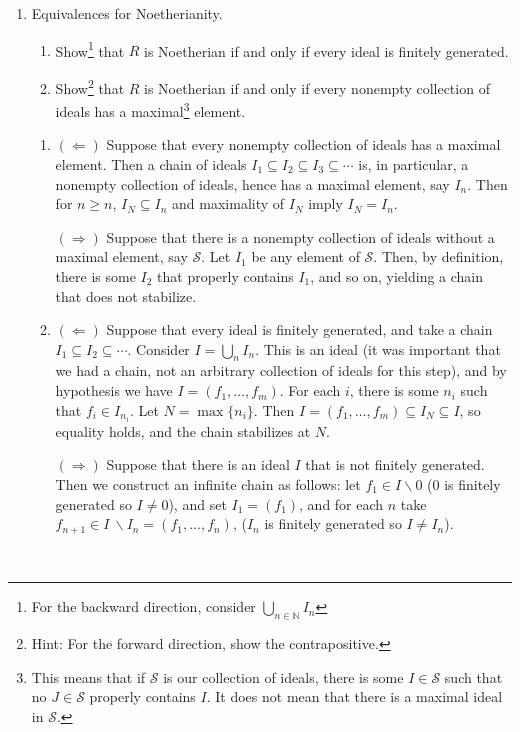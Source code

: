 \documentclass[12pt]{amsart}
\newcommand{\Bold}[1]{\contour{black}{#1}}
\newcommand{\N}{\mathbb{N}}
\newcommand{\1}{\mathbbm{1}}
\newcommand{\solution}[1]{\ifthenelse {\equal{\displaysol}{1}} {\begin{framed}{\color{meretale}\noindent #1}\end{framed}} { \ }}
\newcommand\itemA{\stepcounter{enumi}\item[{\Bold{(\theenumi)}}]}
\newcommand\itema{\stepcounter{enumii}\item[{\Bold{(\theenumii)}}]}
\begin{document}
 
\begin{enumerate}
\itemA Equivalences for Noetherianity.
\begin{enumerate}
\itema Show\footnote{For the backward direction, consider $\bigcup_{n\in \N} I_n$} that $R$ is Noetherian if and only if every ideal is finitely generated.
\itema Show\footnote{Hint: For the forward direction, show the contrapositive.} that $R$ is Noetherian if and only if every nonempty collection of ideals has a maximal\footnote{This means that if $\mathcal{S}$ is our collection of ideals, there is some $I\in \mathcal{S}$ such that no $J\in \mathcal{S}$ properly contains $I$. It does not mean that there is a maximal ideal in $\mathcal{S}$.} element.
\end{enumerate}


\solution{
\begin{enumerate}
\itema $(\Leftarrow)$ Suppose that every nonempty collection of ideals has a maximal element. Then a chain of ideals $I_1 \subseteq I_2 \subseteq I_3 \subseteq \cdots$ is, in particular, a nonempty collection of ideals, hence has a maximal element, say $I_n$. Then for $n\geq n$, $I_N \subseteq I_n$ and maximality of $I_N$ imply $I_N = I_n$.

$(\Rightarrow)$ Suppose that there is a nonempty collection of ideals without a maximal element, say $\mathcal{S}$. Let $I_1$ be any element of $\mathcal{S}$. Then, by definition, there is some $I_2$ that properly contains $I_1$, and so on, yielding a chain that does not stabilize.

\itema $(\Leftarrow)$ Suppose that every ideal is finitely generated, and take a chain $I_1 \subseteq I_2 \subseteq \cdots$. Consider $I= \bigcup_n I_n$. This is an ideal (it was important that we had a chain, not an arbitrary collection of ideals for this step), and by hypothesis we have $I=(f_1,\dots,f_m)$. For each $i$, there is some $n_i$ such that $f_i \in I_{n_i}$. Let $N=\max\{n_i\}$. Then $I = (f_1,\dots, f_m) \subseteq I_N \subseteq I$, so equality holds, and the chain stabilizes at $N$.


$(\Rightarrow)$ Suppose that there is an ideal $I$ that is not finitely generated. Then we construct an infinite chain as follows: let $f_1\in I \smallsetminus 0$ ($0$ is finitely generated so $I\neq 0$), and set $I_1 = (f_1)$, and for each $n$ take $f_{n+1} \in I \  \smallsetminus I_n= (f_1,\dots, f_n)$, ($I_n$ is finitely generated so $I\neq I_n$).
\end{enumerate}

}


\end{enumerate}
\end{document}
